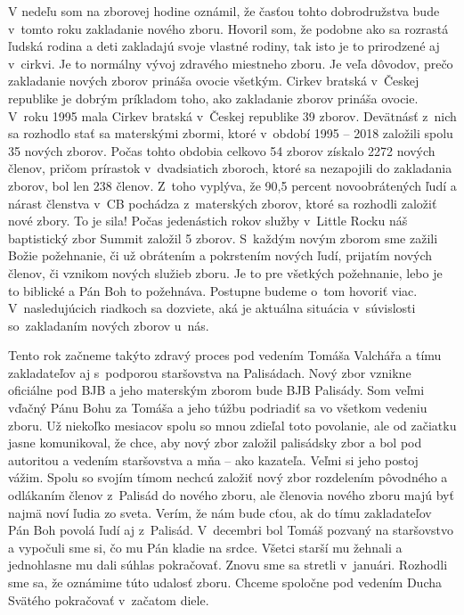 V nedeľu som na zborovej hodine oznámil, že časťou tohto dobrodružstva bude v~tomto roku zakladanie nového zboru. Hovoril som, že podobne ako sa rozrastá ľudská rodina a deti zakladajú svoje vlastné rodiny, tak isto je to prirodzené aj v~cirkvi. Je to normálny vývoj zdravého miestneho zboru. Je veľa dôvodov, prečo zakladanie nových zborov prináša ovocie všetkým.
Cirkev bratská v~Českej republike je dobrým príkladom toho, ako zakladanie zborov prináša ovocie. V~roku 1995 mala Cirkev bratská v~Českej republike 39 zborov. Devätnásť z~nich sa rozhodlo stať sa materskými zbormi, ktoré v~období 1995 – 2018 založili spolu 35 nových zborov. Počas tohto obdobia celkovo 54 zborov získalo 2272 nových členov, pričom prírastok v~dvadsiatich zboroch, ktoré sa nezapojili do zakladania zborov, bol len 238 členov. Z~toho vyplýva, že 90,5 percent novoobrátených ľudí a nárast členstva v~CB pochádza z~materských zborov, ktoré sa rozhodli založiť nové zbory.
To je sila! Počas jedenástich rokov služby v~Little Rocku náš baptistický zbor Summit založil 5 zborov. S~každým novým zborom sme zažili Božie požehnanie, či už obrátením a pokrstením nových ľudí, prijatím nových členov, či vznikom nových služieb zboru. Je to pre všetkých požehnanie, lebo je to biblické a Pán Boh to požehnáva. Postupne budeme o~tom hovoriť viac. V~nasledujúcich riadkoch sa dozviete, aká je aktuálna situácia v~súvislosti so~zakladaním nových zborov u~nás.

Tento rok začneme takýto zdravý proces pod vedením Tomáša Valchářa a tímu zakladateľov aj s~podporou staršovstva na Palisádach. Nový zbor vznikne oficiálne pod BJB  a jeho materským zborom bude BJB Palisády. Som veľmi vďačný Pánu Bohu za Tomáša a jeho túžbu podriadiť sa vo všetkom vedeniu zboru. Už niekoľko mesiacov spolu so mnou zdieľal toto povolanie, ale od začiatku jasne komunikoval, že chce, aby nový zbor založil palisádsky zbor a bol pod autoritou a vedením staršovstva a mňa – ako kazateľa. Veľmi si jeho postoj vážim. Spolu so svojím tímom nechcú založiť nový zbor rozdelením pôvodného a odlákaním členov z~Palisád do nového zboru, ale členovia nového zboru majú byť najmä noví ľudia zo sveta. Verím, že nám bude cťou, ak do tímu zakladateľov Pán Boh povolá ľudí aj z~Palisád. V~decembri bol Tomáš pozvaný na staršovstvo a vypočuli sme si, čo mu Pán kladie na srdce. Všetci starší mu žehnali a jednohlasne mu dali súhlas pokračovať. Znovu sme sa stretli v~januári. Rozhodli sme sa, že oznámime túto udalosť zboru. Chceme spoločne pod vedením Ducha Svätého pokračovať v~začatom diele.

